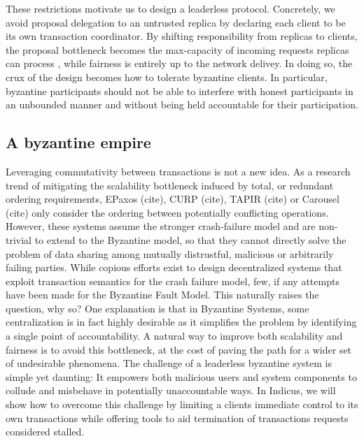 These restrictions motivate us to design a leaderless protocol. Concretely, we avoid proposal delegation to an untrusted replica by declaring each client to be its own transaction coordinator.
By shifting responsibility from replicas to clients, the proposal bottleneck becomes the max-capacity of incoming requests replicas can process , while fairness is entirely up to the network delivey. In doing so, the crux of the design becomes how to tolerate byzantine clients. In particular, byzantine participants should not be able to interfere with honest participants in an unbounded manner and without being held accountable for their participation. 



\subsection{A byzantine empire}
Leveraging commutativity between transactions is not a new idea. As a research trend of mitigating the scalability bottleneck induced by total, or redundant ordering requirements, EPaxos (cite), CURP (cite), TAPIR (cite) or Carousel (cite) only consider the ordering between potentially conflicting operations. However, these systems assume the stronger crash-failure model and are non-trivial to extend to the Byzantine model, so that they cannot directly solve the problem of data sharing among mutually distrustful, malicious or arbitrarily failing parties.
While copious efforts exist to design decentralized systems that exploit transaction semantics for the crash failure model, few, if any attempts have been made for the Byzantine Fault Model. This naturally raises the question, why so? One explanation is that in Byzantine Systems, some centralization is in fact highly desirable as it simplifies the problem by identifying a single point of accountability. A natural way to improve both scalability and fairness is to avoid this bottleneck, at the cost of paving the path for a wider set of undesirable phenomena. The challenge of a leaderless byzantine system is simple yet daunting: It empowers both malicious users and system components to collude and misbehave in potentially unaccountable ways. In Indicus, we will show how to overcome this challenge by limiting a clients immediate control to its own transactions while offering tools to aid termination of transactions requests considered stalled.

